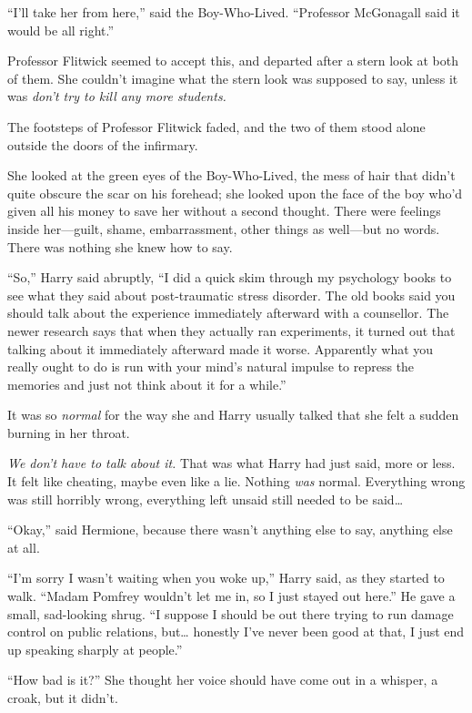``I'll take her from here,'' said the Boy-Who-Lived. ``Professor
McGonagall said it would be all right.''

Professor Flitwick seemed to accept this, and departed after a stern
look at both of them. She couldn't imagine what the stern look was
supposed to say, unless it was \emph{don't try to kill any more
students.}

The footsteps of Professor Flitwick faded, and the two of them stood
alone outside the doors of the infirmary.

She looked at the green eyes of the Boy-Who-Lived, the mess of hair that
didn't quite obscure the scar on his forehead; she looked upon the face
of the boy who'd given all his money to save her without a second
thought. There were feelings inside her---guilt, shame, embarrassment,
other things as well---but no words. There was nothing she knew how to
say.

``So,'' Harry said abruptly, ``I did a quick skim through my psychology
books to see what they said about post-traumatic stress disorder. The
old books said you should talk about the experience immediately
afterward with a counsellor. The newer research says that when they
actually ran experiments, it turned out that talking about it
immediately afterward made it worse. Apparently what you really ought to
do is run with your mind's natural impulse to repress the memories and
just not think about it for a while.''

It was so \emph{normal} for the way she and Harry usually talked that
she felt a sudden burning in her throat.

\emph{We don't have to talk about it.} That was what Harry had just
said, more or less. It felt like cheating, maybe even like a lie.
Nothing \emph{was} normal. Everything wrong was still horribly wrong,
everything left unsaid still needed to be said\ldots{}

``Okay,'' said Hermione, because there wasn't anything else to say,
anything else at all.

``I'm sorry I wasn't waiting when you woke up,'' Harry said, as they
started to walk. ``Madam Pomfrey wouldn't let me in, so I just stayed
out here.'' He gave a small, sad-looking shrug. ``I suppose I should be
out there trying to run damage control on public relations, but\ldots{}
honestly I've never been good at that, I just end up speaking sharply at
people.''

``How bad is it?'' She thought her voice should have come out in a
whisper, a croak, but it didn't.


